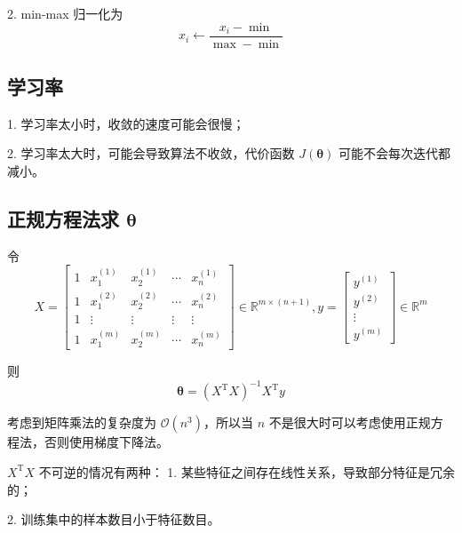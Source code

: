 2. min-max 归一化为
\begin{equation}
    x_i \leftarrow \dfrac{x_i - \min}{\max - \min}
\end{equation}

\subsection{学习率}
1. 学习率太小时，收敛的速度可能会很慢；

2. 学习率太大时，可能会导致算法不收敛，代价函数 $J(\boldsymbol{\theta})$ 可能不会每次迭代都减小。

\subsection{正规方程法求 $\boldsymbol{\theta}$}

令
\begin{equation}
    X = \begin{bmatrix}1 & x^{(1)}_1 & x^{(1)}_2 & \cdots & x^{(1)}_n \\ 1 & x^{(2)}_1 & x^{(2)}_2 & \cdots & x^{(2)}_n 
        \\ 1 & \vdots & \vdots & \vdots & \vdots \\ 1 & x^{(m)}_1 & x^{(m)}_2 & \cdots & x^{(m)}_n\end{bmatrix} \in \mathbb R^{m \times (n+1)},
    y = \begin{bmatrix}y^{(1)} \\ y^{(2)} \\ \vdots \\ y^{(m)}\end{bmatrix} \in \mathbb R^m
\end{equation}

则
\begin{equation}
    \boldsymbol{\theta} = (X^\mathrm T X)^{-1}X^\mathrm Ty
\end{equation}

考虑到矩阵乘法的复杂度为 $\mathcal O(n^3)$，所以当 $n$ 不是很大时可以考虑使用正规方程法，否则使用梯度下降法。

$X^\mathrm T X$ 不可逆的情况有两种：
1. 某些特征之间存在线性关系，导致部分特征是冗余的；

2. 训练集中的样本数目小于特征数目。